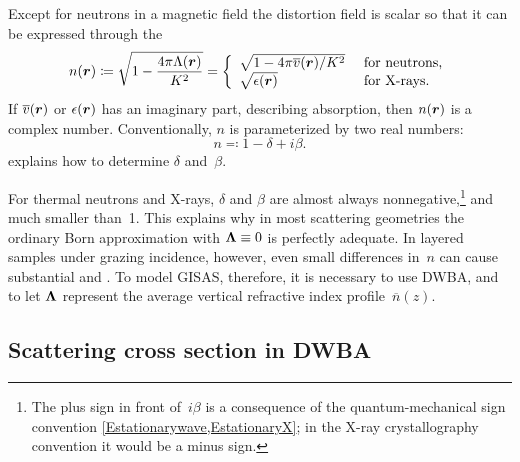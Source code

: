 Except for neutrons in a magnetic field
the distortion field is scalar so
that it can be expressed through the 
%
%
%
\begin{equation}\label{EnkK}
  n(\r)
  \coloneqq\sqrt{1-\frac{4\pi\Lambda(\r)}{K^2}}
  = \left\{\begin{array}{ll}
       \sqrt{1-4\pi\mv(\r)/K^2} &\text{ for neutrons,}\\
       \sqrt{\epsilon(\r)} &\text{ for X-rays.}
    \end{array}\right.
\end{equation}
If $\overline{v}(\bm{r})$ or $\epsilon(\bm{r})$ has an imaginary part, describing absorption,
%
then $n(\bm{r})$ is a complex number.
Conventionally, $n$ is parameterized by two real numbers:
\begin{equation}\label{Endb1}
  n \eqqcolon  1-\delta +i\beta.
\end{equation}
%
%
 explains how to determine $\delta$ and~$\beta$.

For thermal neutrons and X-rays,
$\delta$ and $\beta$ are almost always nonnegative,\footnote
{The plus sign in front of~$i\beta$ is a consequence of
the quantum-mechanical sign convention \cref{Estationarywave,EstationaryX};
in the X-ray crystallography convention it would be a minus sign.
%
}
and much smaller than~1.
This explains why in most scattering geometries
%
the ordinary Born approximation
%
with $\bm{\Lambda}\equiv0$ is perfectly adequate.
In layered samples under grazing incidence,
%
however, even small differences in~$n$ can cause substantial
 and .
%
%
To model GISAS, therefore,
it is necessary to use DWBA,
%
and to let $\bm{\Lambda}$ represent
the average vertical refractive index profile~$\overline{n}(z)$.
%

\subsection{Scattering cross section in DWBA}\label{SxDWBA}

